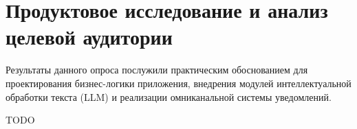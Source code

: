 \section{Продуктовое исследование и анализ целевой аудитории}
\label{sec:product-research}

Результаты данного опроса послужили практическим обоснованием для проектирования бизнес-логики приложения, внедрения модулей интеллектуальной обработки текста (LLM) и реализации омниканальной системы уведомлений.

TODO